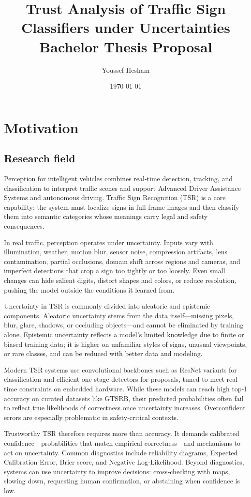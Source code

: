 \documentclass[11pt,a4paper]{article}
\title{Trust Analysis of Traffic Sign Classifiers under Uncertainties\\[2mm]
Bachelor Thesis Proposal}
\author{Youssef Hesham}
\date{\today}
\begin{document}
\maketitle

\section{Motivation}
\subsection{Research field}
Perception for intelligent vehicles combines real-time detection, tracking, and classification to interpret traffic scenes and support Advanced Driver Assistance Systems and autonomous driving. Traffic Sign Recognition (TSR) is a core capability: the system must localize signs in full-frame images and then classify them into semantic categories whose meanings carry legal and safety consequences.

In real traffic, perception operates under uncertainty. Inputs vary with illumination, weather, motion blur, sensor noise, compression artifacts, lens contamination, partial occlusions, domain shift across regions and cameras, and imperfect detections that crop a sign too tightly or too loosely. Even small changes can hide salient digits, distort shapes and colors, or reduce resolution, pushing the model outside the conditions it learned from.

Uncertainty in TSR is commonly divided into aleatoric and epistemic components. Aleatoric uncertainty stems from the data itself—missing pixels, blur, glare, shadows, or occluding objects—and cannot be eliminated by training alone. Epistemic uncertainty reflects a model’s limited knowledge due to finite or biased training data; it is higher on unfamiliar styles of signs, unusual viewpoints, or rare classes, and can be reduced with better data and modeling.

Modern TSR systems use convolutional backbones such as ResNet variants for classification and efficient one‑stage detectors for proposals, tuned to meet real-time constraints on embedded hardware. While these models can reach high top‑1 accuracy on curated datasets like GTSRB, their predicted probabilities often fail to reflect true likelihoods of correctness once uncertainty increases. Overconfident errors are especially problematic in safety‑critical contexts.

Trustworthy TSR therefore requires more than accuracy. It demands calibrated confidence—probabilities that match empirical correctness—and mechanisms to act on uncertainty. Common diagnostics include reliability diagrams, Expected Calibration Error, Brier score, and Negative Log‑Likelihood. Beyond diagnostics, systems can use uncertainty to improve decisions: cross‑checking with maps, slowing down, requesting human confirmation, or abstaining when confidence is low.
\end{document}
